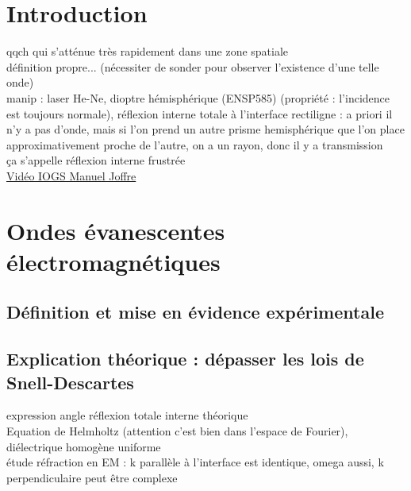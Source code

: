 


\biblio{}

\section*{Introduction}
qqch qui s'atténue très rapidement dans une zone spatiale \\
définition propre... (nécessiter de sonder pour observer l'existence d'une telle onde) \\
manip : laser He-Ne, dioptre hémisphérique (ENSP585) (propriété : l'incidence est toujours normale), réflexion interne totale à l'interface rectiligne : a priori il n'y a pas d'onde, mais si l'on prend un autre prisme hemisphérique que l'on place approximativement proche de l'autre, on a un rayon, donc il y a transmission \\
ça s'appelle réflexion interne frustrée \\ 
\href{https://fr.coursera.org/lecture/mecanique-quantique/8-2-la-reflexion-totale-interne-frustree-e5hyh}{Vidéo IOGS Manuel Joffre}

\section{Ondes évanescentes électromagnétiques}
\subsection{Définition et mise en évidence expérimentale}
\subsection{Explication théorique : dépasser les lois de Snell-Descartes}
expression angle réflexion totale interne théorique\\
Equation de Helmholtz (attention c'est bien dans l'espace de Fourier), diélectrique homogène uniforme\\
étude réfraction en EM : k parallèle à l'interface est identique, omega aussi, k perpendiculaire peut être complexe
